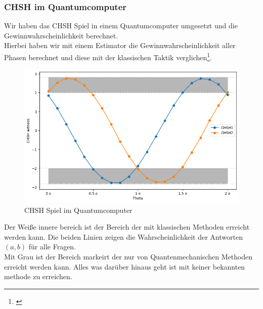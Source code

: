 \subsubsection{CHSH im Quantumcomputer}
\label{subsubsec:chsh_quantumcomputer}
Wir haben das CHSH Spiel in einem Quantumcomputer umgesetzt und die Gewinnwahrscheinlichkeit berechnet.\\
Hierbei haben wir mit einem Estimator die Gewinnwahrscheinlichkeit aller Phasen berechnet und diese mit der klassischen Taktik verglichen\footnote{\cite{IBM_chsh_2025}}.

\begin{figure}[H]
    \centering
    \includegraphics[width=0.8\linewidth]{img/CHSH-Output.png}
    \caption{CHSH Spiel im Quantumcomputer}
    \label{fig:CHSHQuantum}
\end{figure}

Der Weiße innere bereich ist der Bereich der mit klassischen Methoden erreicht werden kann.
Die beiden Linien zeigen die Wahrscheinlichkeit der Antworten $(a, b)$ für alle Fragen.\\
Mit Grau ist der Bereich markeirt der nur von Quantenmechanischen Methoden erreicht werden kann. Alles was darüber hinaus geht ist mit keiner bekannten methode zu erreichen.\\

